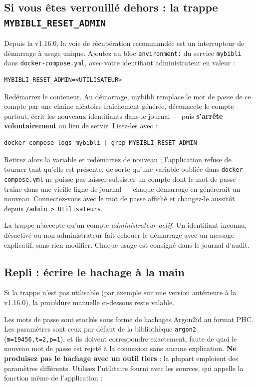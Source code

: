 \subsection*{Si vous êtes verrouillé dehors : la trappe \texttt{MYBIBLI\_RESET\_ADMIN}}

Depuis la v1.16.0, la voie de récupération recommandée est un
interrupteur de démarrage à usage unique. Ajoutez au bloc
\texttt{environment:} du service \texttt{mybibli} dans
\texttt{docker-compose.yml}, avec votre identifiant administrateur en
valeur :

\begin{lstlisting}
MYBIBLI_RESET_ADMIN=<UTILISATEUR>
\end{lstlisting}

Redémarrez le conteneur. Au démarrage, mybibli remplace le mot de passe
de ce compte par une chaîne aléatoire fraîchement générée, déconnecte le
compte partout, écrit les nouveaux identifiants dans le journal — puis
\textbf{s'arrête volontairement} au lieu de servir. Lisez-les avec :

\begin{lstlisting}
docker compose logs mybibli | grep MYBIBLI_RESET_ADMIN
\end{lstlisting}

Retirez alors la variable et redémarrez de nouveau ; l'application
refuse de tourner tant qu'elle est présente, de sorte qu'une variable
oubliée dans \texttt{docker-compose.yml} ne puisse pas laisser subsister
un compte dont le mot de passe traîne dans une vieille ligne de journal
— chaque démarrage en générerait un nouveau. Connectez-vous avec le mot
de passe affiché et changez-le aussitôt depuis
\texttt{/admin > Utilisateurs}.

La trappe n'accepte qu'un compte \emph{administrateur actif}. Un
identifiant inconnu, désactivé ou non administrateur fait échouer le
démarrage avec un message explicatif, sans rien modifier. Chaque usage
est consigné dans le journal d'audit.

\subsection*{Repli : écrire le hachage à la main}

Si la trappe n'est pas utilisable (par exemple sur une version
antérieure à la v1.16.0), la procédure manuelle ci-dessous reste
valable.

Les mots de passe sont stockés sous forme de hachages Argon2id au format
PHC. Les paramètres sont ceux par défaut de la bibliothèque
\texttt{argon2} (\texttt{m=19456,t=2,p=1}), et ils doivent correspondre
exactement, faute de quoi le nouveau mot de passe est rejeté à la
connexion sans aucune explication. \textbf{Ne produisez pas le hachage
avec un outil tiers} : la plupart emploient des paramètres différents.
Utilisez l'utilitaire fourni avec les sources, qui appelle la fonction
même de l'application :

